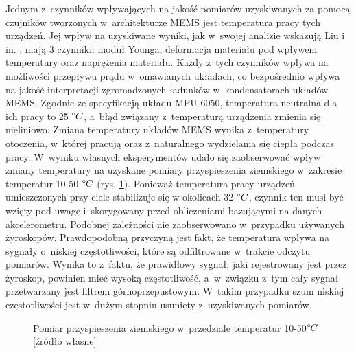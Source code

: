 Jednym z~czynników wpływających na jakość pomiarów uzyskiwanych za pomocą czujników tworzonych w~architekturze MEMS jest temperatura pracy tych urządzeń. Jej wpływ na uzyskiwane wyniki, jak w~swojej analizie wskazują Liu i in. \cite{Liu2007, Liu2015}, mają 3 czynniki: moduł Younga, deformacja materiału pod wpływem temperatury oraz naprężenia materiału. Każdy z~tych czynników wpływa na możliwości przepływu prądu w~omawianych układach, co bezpośrednio wpływa na jakość interpretacji zgromadzonych ładunków w~kondensatorach układów MEMS. Zgodnie ze specyfikacją układu MPU-6050, temperatura neutralna dla ich pracy to 25 $\degree C$, a~błąd związany z~temperaturą urządzenia zmienia się nieliniowo. Zmiana temperatury układów MEMS wynika z~temperatury otoczenia, w~której pracują oraz z~naturalnego wydzielania się ciepła podczas pracy. W~wyniku własnych eksperymentów udało się zaobserwować wpływ zmiany temperatury na uzyskane pomiary przyspieszenia ziemskiego w~zakresie temperatur 10-50 $\degree C$ (rys. \ref{fig:characteristics:imu:temp}). Ponieważ temperatura pracy urządzeń umieszczonych przy ciele stabilizuje się w okolicach 32 $\degree C$, czynnik ten musi być wzięty pod uwagę i~skorygowany przed obliczeniami bazującymi na danych akcelerometru. Podobnej zależności nie zaobserwowano w~przypadku używanych żyroskopów. Prawdopodobną przyczyną jest fakt, że temperatura wpływa na sygnały o~niskiej częstotliwości, które są odfiltrowane w~trakcie odczytu pomiarów. Wynika to z~faktu, że prawidłowy sygnał, jaki rejestrowany jest przez żyroskop, powinien mieć wysoką częstotliwość, a~w~związku z~tym cały sygnał przetwarzany jest filtrem górnoprzepustowym. W~takim przypadku szum niskiej częstotliwości jest w~dużym stopniu usunięty z~uzyskiwanych pomiarów.
																																													
\begin{savenotes}
	\begin{figure}[!htb]
		\centering
															
		\caption[Pomiar przyspieszenia ziemskiego w~przedziale temperatur 10-50$\degree C$]{Pomiar przyspieszenia ziemskiego w~przedziale temperatur 10-50$\degree C$ [źródło własne]}
		\label{fig:characteristics:imu:temp}
	\end{figure}
\end{savenotes}
																																																	
